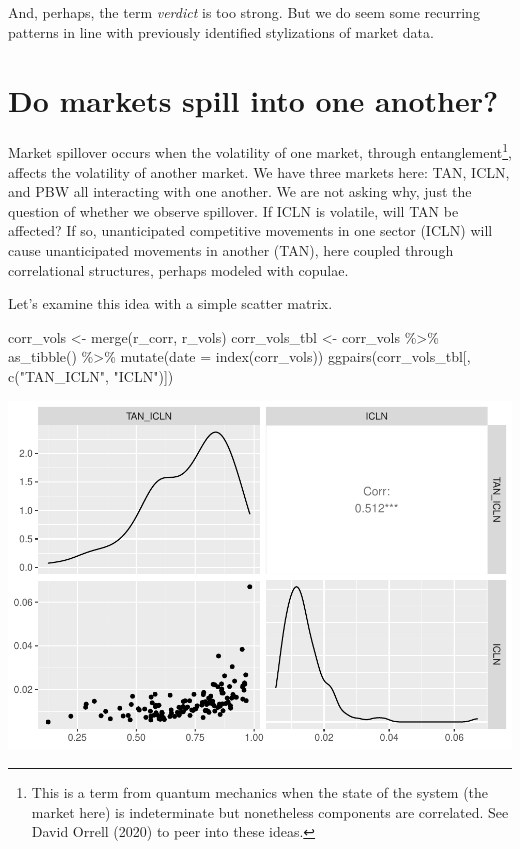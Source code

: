 \documentclass{article}
\newenvironment{Shaded}{\begin{snugshade}}{\end{snugshade}}
\newcommand{\AttributeTok}[1]{\textcolor[rgb]{0.77,0.63,0.00}{#1}}
\newcommand{\FunctionTok}[1]{\textcolor[rgb]{0.00,0.00,0.00}{#1}}
\newcommand{\NormalTok}[1]{#1}
\newcommand{\OtherTok}[1]{\textcolor[rgb]{0.56,0.35,0.01}{#1}}
\newcommand{\SpecialCharTok}[1]{\textcolor[rgb]{0.00,0.00,0.00}{#1}}
\newcommand{\StringTok}[1]{\textcolor[rgb]{0.31,0.60,0.02}{#1}}
\begin{document}
And, perhaps, the term \emph{verdict} is too strong. But we do seem some
recurring patterns in line with previously identified stylizations of
market data.

\hypertarget{do-markets-spill-into-one-another}{%
\section{Do markets spill into one
another?}\label{do-markets-spill-into-one-another}}

Market spillover occurs when the volatility of one market, through
entanglement\footnote{This is a term from quantum mechanics when the
  state of the system (the market here) is indeterminate but nonetheless
  components are correlated. See David Orrell (2020) to peer into these
  ideas.}, affects the volatility of another market. We have three
markets here: TAN, ICLN, and PBW all interacting with one another. We
are not asking why, just the question of whether we observe spillover.
If ICLN is volatile, will TAN be affected? If so, unanticipated
competitive movements in one sector (ICLN) will cause unanticipated
movements in another (TAN), here coupled through correlational
structures, perhaps modeled with copulae.

Let's examine this idea with a simple scatter matrix.

\begin{Shaded}
\begin{Highlighting}[]
\NormalTok{corr\_vols }\OtherTok{\textless{}{-}} \FunctionTok{merge}\NormalTok{(r\_corr, r\_vols)}
\NormalTok{corr\_vols\_tbl }\OtherTok{\textless{}{-}}\NormalTok{ corr\_vols }\SpecialCharTok{\%\textgreater{}\%} \FunctionTok{as\_tibble}\NormalTok{() }\SpecialCharTok{\%\textgreater{}\%} 
  \FunctionTok{mutate}\NormalTok{(}\AttributeTok{date =} \FunctionTok{index}\NormalTok{(corr\_vols)) }
\FunctionTok{ggpairs}\NormalTok{(corr\_vols\_tbl[, }\FunctionTok{c}\NormalTok{(}\StringTok{"TAN\_ICLN"}\NormalTok{, }\StringTok{"ICLN"}\NormalTok{)])}
\end{Highlighting}
\end{Shaded}

\includegraphics{market-facts_files/figure-latex/pairs-1.pdf}
\end{document}
